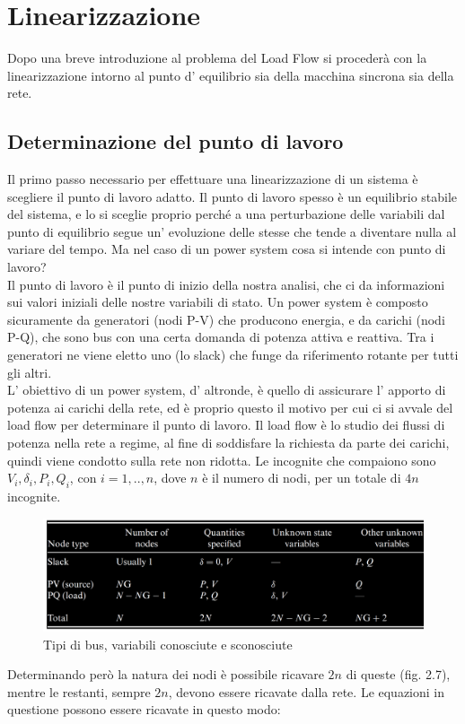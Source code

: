\documentclass[Lau,noexaminfo]{sapthesis}
\begin{document}
	\section{Linearizzazione}
	Dopo una breve introduzione al problema del Load Flow si procederà con la linearizzazione intorno al punto d' equilibrio sia della macchina sincrona sia della rete.
	\subsection{Determinazione del punto di lavoro}
	Il primo passo necessario per effettuare una linearizzazione di un sistema è scegliere il punto di lavoro adatto. Il punto di lavoro spesso è un equilibrio stabile del sistema, e lo si sceglie proprio perché a una perturbazione delle variabili dal punto di equilibrio segue un' evoluzione delle stesse che tende a diventare nulla al variare del tempo. Ma nel caso di un power system cosa si intende con punto di lavoro?\\
	Il punto di lavoro è il punto di inizio della nostra analisi, che ci da informazioni sui valori iniziali delle nostre variabili di stato. Un power system è composto sicuramente da generatori (nodi P-V) che producono energia, e da carichi (nodi P-Q), che sono bus con una certa domanda di potenza attiva e reattiva. Tra i generatori ne viene eletto uno (lo slack) che funge da riferimento rotante per tutti gli altri.\\ L' obiettivo di un power system, d' altronde, è quello di assicurare l' apporto di potenza ai carichi della rete, ed è proprio questo il motivo per cui ci si avvale del load flow per determinare il punto di lavoro. Il load flow è lo studio dei flussi di potenza nella rete a regime, al fine di soddisfare la richiesta da parte dei carichi, quindi viene condotto sulla rete non ridotta. Le incognite che compaiono sono $V_i,\delta_i,P_i,Q_i$, con $i=1,..,n$, dove $n$ è il numero di nodi, per un totale di $4n$ incognite.
	\begin{figure}
		\centering
		\includegraphics[height=0.15\textheight]{tipidibus}
		\caption{Tipi di bus, variabili conosciute e sconosciute}
	\end{figure} Determinando però la natura dei nodi è possibile ricavare $2n$ di queste (fig. 2.7), mentre le restanti, sempre $2n$, devono essere ricavate dalla rete. Le equazioni in questione possono essere ricavate in questo modo:\\
\end{document}
